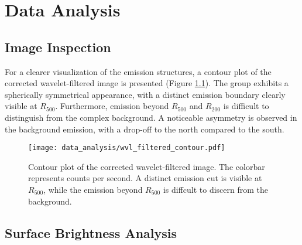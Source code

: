 
\chapter{Data Analysis}
\label{sec:data_analysis}
\section{Image Inspection}
%
For a clearer visualization of the emission structures, a contour plot of the corrected wavelet-filtered image is presented (Figure \ref{fig:contour_wvl_filtered}). The group exhibits a spherically symmetrical appearance, with a distinct emission boundary clearly visible at \(R_{500}\). Furthermore, emission beyond \(R_{500}\) and \(R_{200}\) is difficult to distinguish from the complex background. A noticeable asymmetry is observed in the background emission, with a drop-off to the north compared to the south. 
\begin{figure}[htbp]
    \centering
    \texttt{[image: data\_analysis/wvl\_filtered\_contour.pdf]}
    \caption{
        Contour plot of the corrected wavelet-filtered image. The colorbar represents counts per second. A distinct emission cut is visible at \(R_{500}\), while the emission beyond \(R_{500}\) is diffcult to discern from the background.}
    \label{fig:contour_wvl_filtered}
\end{figure}
\section{Surface Brightness Analysis}
